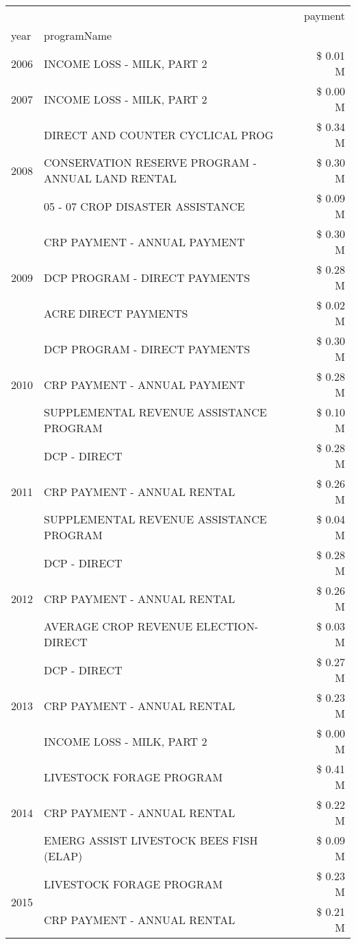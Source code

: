 \begin{tabular}{llr}
\toprule
 &  & payment \\
year & programName &  \\
\midrule
2006 & INCOME LOSS - MILK, PART 2 & \$ 0.01 M \\
\cline{1-3}
2007 & INCOME LOSS - MILK, PART 2 & \$ 0.00 M \\
\cline{1-3}
\multirow[t]{3}{*}{2008} & DIRECT AND COUNTER CYCLICAL PROG & \$ 0.34 M \\
 & CONSERVATION RESERVE PROGRAM - ANNUAL LAND RENTAL & \$ 0.30 M \\
 & 05 - 07 CROP DISASTER ASSISTANCE & \$ 0.09 M \\
\cline{1-3}
\multirow[t]{3}{*}{2009} & CRP PAYMENT - ANNUAL PAYMENT & \$ 0.30 M \\
 & DCP PROGRAM - DIRECT PAYMENTS & \$ 0.28 M \\
 & ACRE DIRECT PAYMENTS & \$ 0.02 M \\
\cline{1-3}
\multirow[t]{3}{*}{2010} & DCP PROGRAM - DIRECT PAYMENTS & \$ 0.30 M \\
 & CRP PAYMENT - ANNUAL PAYMENT & \$ 0.28 M \\
 & SUPPLEMENTAL REVENUE ASSISTANCE PROGRAM & \$ 0.10 M \\
\cline{1-3}
\multirow[t]{3}{*}{2011} & DCP - DIRECT & \$ 0.28 M \\
 & CRP PAYMENT - ANNUAL RENTAL & \$ 0.26 M \\
 & SUPPLEMENTAL REVENUE ASSISTANCE PROGRAM & \$ 0.04 M \\
\cline{1-3}
\multirow[t]{3}{*}{2012} & DCP - DIRECT & \$ 0.28 M \\
 & CRP PAYMENT - ANNUAL RENTAL & \$ 0.26 M \\
 & AVERAGE CROP REVENUE ELECTION-DIRECT & \$ 0.03 M \\
\cline{1-3}
\multirow[t]{3}{*}{2013} & DCP - DIRECT & \$ 0.27 M \\
 & CRP PAYMENT - ANNUAL RENTAL & \$ 0.23 M \\
 & INCOME LOSS - MILK, PART 2 & \$ 0.00 M \\
\cline{1-3}
\multirow[t]{3}{*}{2014} & LIVESTOCK FORAGE PROGRAM & \$ 0.41 M \\
 & CRP PAYMENT - ANNUAL RENTAL & \$ 0.22 M \\
 & EMERG ASSIST LIVESTOCK BEES FISH (ELAP) & \$ 0.09 M \\
\cline{1-3}
\multirow[t]{3}{*}{2015} & LIVESTOCK FORAGE PROGRAM & \$ 0.23 M \\
 & CRP PAYMENT - ANNUAL RENTAL & \$ 0.21 M \\

\end{tabular}
